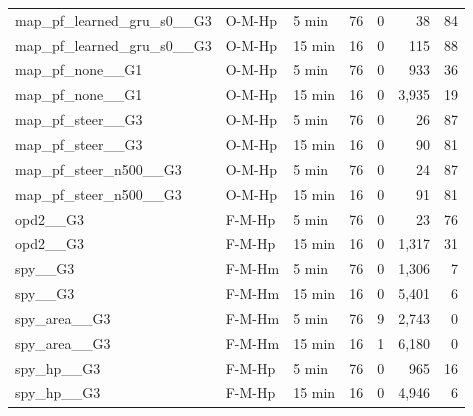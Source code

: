 \begin{table}[t]
\begin{tabular}{lllrrrr}
map\_pf\_learned\_gru\_s0\_\_G3 & O-M-Hp & 5 min & 76 & 0 & 38 & 84 \\
map\_pf\_learned\_gru\_s0\_\_G3 & O-M-Hp & 15 min & 16 & 0 & 115 & 88 \\
map\_pf\_none\_\_G1 & O-M-Hp & 5 min & 76 & 0 & 933 & 36 \\
map\_pf\_none\_\_G1 & O-M-Hp & 15 min & 16 & 0 & 3{,}935 & 19 \\
map\_pf\_steer\_\_G3 & O-M-Hp & 5 min & 76 & 0 & 26 & 87 \\
map\_pf\_steer\_\_G3 & O-M-Hp & 15 min & 16 & 0 & 90 & 81 \\
map\_pf\_steer\_n500\_\_G3 & O-M-Hp & 5 min & 76 & 0 & 24 & 87 \\
map\_pf\_steer\_n500\_\_G3 & O-M-Hp & 15 min & 16 & 0 & 91 & 81 \\
opd2\_\_G3 & F-M-Hp & 5 min & 76 & 0 & 23 & 76 \\
opd2\_\_G3 & F-M-Hp & 15 min & 16 & 0 & 1{,}317 & 31 \\
spy\_\_G3 & F-M-Hm & 5 min & 76 & 0 & 1{,}306 & 7 \\
spy\_\_G3 & F-M-Hm & 15 min & 16 & 0 & 5{,}401 & 6 \\
spy\_area\_\_G3 & F-M-Hm & 5 min & 76 & 9 & 2{,}743 & 0 \\
spy\_area\_\_G3 & F-M-Hm & 15 min & 16 & 1 & 6{,}180 & 0 \\
spy\_hp\_\_G3 & F-M-Hp & 5 min & 76 & 0 & 965 & 16 \\
spy\_hp\_\_G3 & F-M-Hp & 15 min & 16 & 0 & 4{,}946 & 6 \\
\bottomrule\end{tabular}
\end{table}
